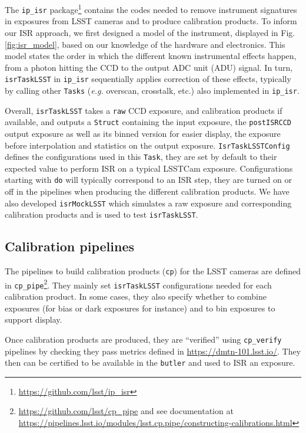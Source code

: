 The \texttt{ip\_isr} package\footnote{\url{https://github.com/lsst/ip_isr}} contains the codes needed to remove instrument signatures in exposures from LSST cameras and to produce calibration products.
To inform our ISR approach, we first designed a model of the instrument, displayed in Fig. \ref{fig:isr_model}, based on our knowledge of the hardware and electronics. This model states the order in which the different known instrumental effects happen, from a photon hitting the CCD to the output ADC unit (ADU) signal.
In turn, \texttt{isrTaskLSST} in \texttt{ip\_isr} sequentially applies correction of these effects, typically by calling other \texttt{Tasks} (\textit{e.g.} overscan, crosstalk, etc.) also implemented in \texttt{ip\_isr}.





Overall, \texttt{isrTaskLSST} takes a \texttt{raw} CCD exposure, and calibration products if available, and outputs a \texttt{Struct} containing the input exposure, the \texttt{postISRCCD} output exposure as well as its binned version for easier display, the exposure before interpolation and statistics on the output exposure.
\texttt{IsrTaskLSSTConfig} defines the configurations used in this \texttt{Task}, they are set by default to their expected value to perform ISR on a typical LSSTCam exposure. Configurations starting with \texttt{do} will typically correspond to an ISR step, they are turned on or off in the pipelines when producing the different calibration products.
We have also developed \texttt{isrMockLSST} which simulates a raw exposure and corresponding calibration products and is used to test \texttt{isrTaskLSST}.

\subsection{Calibration pipelines}
\label{sec:calib_pipe}

The pipelines to build calibration products (\texttt{cp}) for the LSST cameras are defined in \texttt{cp\_pipe}\footnote{\url{https://github.com/lsst/cp\_pipe} and see documentation at \url{https://pipelines.lsst.io/modules/lsst.cp.pipe/constructing-calibrations.html}}.
They mainly set \texttt{isrTaskLSST} configurations needed for each calibration product. In some cases, they also specify whether to combine exposures (for bias or dark exposures for instance) and to bin exposures to support display.

Once calibration products are produced, they are ``verified'' using \texttt{cp\_verify} pipelines by checking they pass metrics defined in \url{https://dmtn-101.lsst.io/}. They then can be certified to be available in the \texttt{butler} and used to ISR an exposure.  

